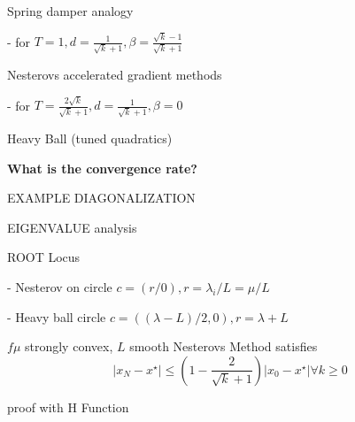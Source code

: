 Spring damper analogy

- for $T = 1, d=\frac{1}{\sqrt{k}+1}, \beta =\frac{\sqrt{k}-1}{\sqrt{k}+1}$ 

Nesterovs accelerated gradient methods

- for $T = \frac{2\sqrt{k}}{\sqrt{k}+1}, d=\frac{1}{\sqrt{k}+1},\beta =0$ 

Heavy Ball (tuned quadratics)

\textbf{What is the convergence rate?}

EXAMPLE DIAGONALIZATION

EIGENVALUE analysis

ROOT Locus

- Nesterov on circle $c=(r/0), r=\lambda_i/L = \mu /L$

- Heavy ball circle $c=((\lambda -L)/2 ,0), r= \lambda +L$

\begin{theorem}
  $f \mu$ strongly convex, $L$ smooth
  Nesterovs Method satisfies
  $$|x_N - x^\star|\le (1-\frac{2}{\sqrt{k}+1})|x_0 - x^\star| \forall k\ge 0$$
  
\end{theorem}

proof with H Function
